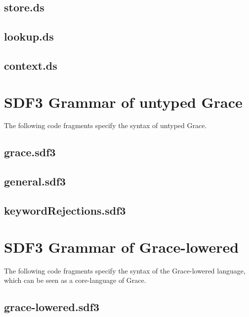 \documentclass[a4paper,UKenglish]{lipics-v2016}
\begin{document}
\subsection{store.ds}

\subsection{lookup.ds}

\subsection{context.ds}


\section{SDF3 Grammar of untyped Grace}
The following code fragments specify the syntax of untyped Grace.

\subsection{grace.sdf3}

\subsection{general.sdf3}

\subsection{keywordRejections.sdf3}


\section{SDF3 Grammar of Grace-lowered}
The following code fragments specify the syntax of the Grace-lowered language, which can be seen as a core-language of Grace.

\subsection{grace-lowered.sdf3}






\end{document}
